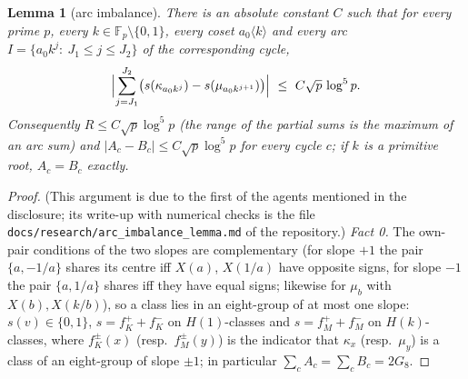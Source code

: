 \documentclass[11pt]{article}
\newtheorem{lemma}[theorem]{Lemma}
\theoremstyle{remark}
\newcommand{\Fp}{\mathbb{F}_p}
\begin{document}
\begin{lemma}[arc imbalance]\label{lem:arc}
There is an absolute constant $C$ such that for every prime $p$, every $k\in\Fp\setminus\{0,1\}$, every coset $a_0\langle k\rangle$ and every
arc $I=\{a_0k^j:\ J_1\le j\le J_2\}$ of the corresponding cycle,
\[
 \Bigl|\sum_{j=J_1}^{J_2}\bigl(s(\kappa_{a_0k^j})-s(\mu_{a_0k^{j+1}})\bigr)\Bigr|\ \le\ C\sqrt p\,\log^5p .
\]
Consequently $R\le C\sqrt p\log^5p$ (the range of the partial sums is the maximum of an arc sum) and $|A_c-B_c|\le C\sqrt p\log^5p$ for every
cycle $c$; if $k$ is a primitive root, $A_c=B_c$ exactly.
\end{lemma}
\begin{proof}
(This argument is due to the first of the agents mentioned in the disclosure; its write-up with numerical checks is the file
\texttt{docs/research/}\allowbreak\texttt{arc\_imbalance\_lemma.md} of the repository.)
\emph{Fact 0.}  The own-pair conditions of the two slopes are complementary (for slope $+1$ the pair $\{a,-1/a\}$ shares its centre iff $X(a)$,
$X(1/a)$ have opposite signs, for slope $-1$ the pair $\{a,1/a\}$ shares iff they have equal signs; likewise for $\mu_b$ with $X(b),X(k/b)$), so
a class lies in an eight-group of at most one slope: $s(v)\in\{0,1\}$, $s=f^+_K+f^-_K$ on $H(1)$-classes and $s=f^+_M+f^-_M$ on $H(k)$-classes,
where $f^{\pm}_K(x)$ (resp.\ $f^\pm_M(y)$) is the indicator that $\kappa_x$ (resp.\ $\mu_y$) is a class of an eight-group of slope $\pm1$;
in particular $\sum_cA_c=\sum_cB_c=2G_8$.


\end{proof}
\end{document}
